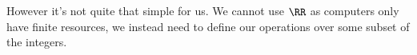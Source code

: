 However it's not quite that simple for us.
We cannot use $\RR$ as computers only have finite resources, we instead need to define our operations over some subset of the integers.
% 
% 
% 
